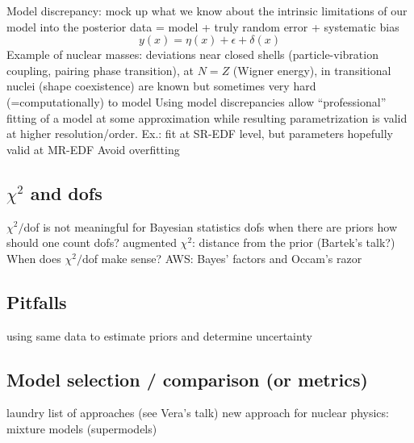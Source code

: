 \bi
  \I Model discrepancy: mock up what we know about the intrinsic limitations of 
     our model into the posterior
  \I data = model + truly random error + systematic bias
  $$ y(x) = \eta(x) + \epsilon + \delta(x) $$
  \I Example of nuclear masses: deviations near closed shells (particle-vibration 
     coupling, pairing phase transition), at $N=Z$ (Wigner energy), in transitional 
     nuclei (shape coexistence) are known but sometimes very hard (=computationally) 
     to model
  \I Using model discrepancies allow ``professional'' fitting of a model at some 
     approximation while resulting parametrization is valid at higher resolution/order.
     Ex.: fit at SR-EDF level, but parameters hopefully valid at MR-EDF
  \I Avoid overfitting
\ei

\subsection{\texorpdfstring{$\chi^2$}{chi-squared} and dofs}  \label{subsec:}

   \bi 
       \I $\chi^2/$dof is not meaningful for Bayesian statistics
       \I dofs when there are priors
       \I how should one count dofs?
       \I augmented $\chi^2$: distance from the prior (Bartek's talk?)
       \I When does $\chi^2/$dof make sense?
       \I AWS: Bayes' factors and Occam's razor
   \ei    

\subsection{Pitfalls}  \label{subsec:pitfalls}

  \bi
    \I using same data to estimate priors and determine uncertainty
  \ei


\subsection{Model selection / comparison (or metrics)}  \label{subsec:model_comparison}

  \bi
    \I laundry list of approaches (see Vera's talk)
    \I new approach for nuclear physics: mixture models (supermodels)
  \ei


